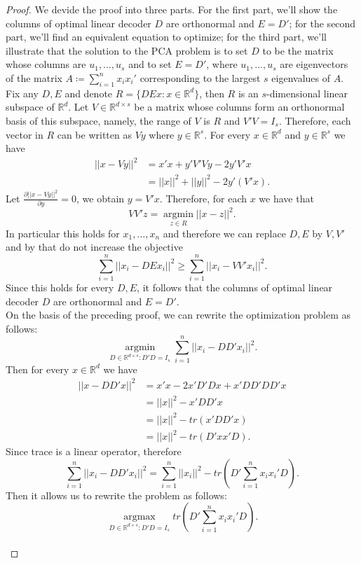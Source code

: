 \begin{proof}
We devide the proof into three parts. For the first part, we'll show the columns of optimal linear decoder $D$ are orthonormal and $E=D'$; for the second part, we'll find an equivalent equation to optimize; for the third part, we'll illustrate that the solution to the PCA problem is to set $D$ to be the matrix whose columns are $u_1,\dots,u_s$ and to set $E=D'$, where $u_1,\dots,u_s$ are eigenvectors of the matrix $A\coloneqq\sum\limits_{i=1}^{n}x_ix_i'$ corresponding to the largest $s$ eigenvalues of $A$.
\\

Fix any $D,E$ and denote $R=\{DEx:x\in {\mathbb R}^d\}$, then $R$ is an $s$-dimensional linear subspace of ${\mathbb R}^d$. Let $V\in {\mathbb R}^{d\times s}$ be a matrix whose columns form an orthonormal basis of this subspace, namely, the range of $V$ is $R$ and $V'V=I_s$. Therefore, each vector in $R$ can be written as $Vy$ where $y\in {\mathbb R}^s$. For every $x\in {\mathbb R}^d$ and $y\in {\mathbb R}^s$ we have
\begin{equation*}
  \begin{aligned}
  ||x-Vy||^2&=x'x+y'V'Vy-2y'V'x\\
  &=||x||^2+||y||^2-2y'(V'x).
  \end{aligned}
\end{equation*}
Let $\frac{\partial ||x-Vy||^2}{\partial y}=0$, we obtain $y=V'x$. Therefore, for each $x$ we have that
$$VV'z=\mathop{\arg\min}\limits_{z\in R}||x-z||^2.$$
In particular this holds for $x_1,\dots,x_n$ and therefore we can replace $D,E$ by $V,V'$ and by that do not increase the objective $$\sum\limits_{i=1}^{n}||x_i-DEx_i||^2\geq\sum\limits_{i=1}^{n}||x_i-VV'x_i||^2.$$
Since this holds for every $D,E$, it follows that the columns of optimal linear decoder $D$ are orthonormal and $E=D'$.
\\

On the basis of the preceding proof, we can rewrite the optimization problem as follows:
$$\mathop{\arg\min}\limits_{D\in{\mathbb R}^{d\times s}:D'D=I_s}\sum\limits_{i=1}^{n}||x_i-DD'x_i||^2.$$
Then for every $x\in {\mathbb R}^d$ we have
\begin{equation*}
  \begin{aligned}
  ||x-DD'x||^2&=x'x-2x'D'Dx+x'DD'DD'x\\
  &=||x||^2-x'DD'x\\
  &=||x||^2-tr(x'DD'x)\\
  &=||x||^2-tr(D'xx'D).
  \end{aligned}
\end{equation*}
Since trace is a linear operator, therefore
$$\sum\limits_{i=1}^{n}||x_i-DD'x_i||^2=\sum\limits_{i=1}^{n}||x_i||^2-tr(D'\sum\limits_{i=1}^{n}x_ix_i'D).$$
Then it allows us to rewrite the problem as follows:
$$\mathop{\arg\max}\limits_{D\in{\mathbb R}^{d\times s}:D'D=I_s}tr(D'\sum\limits_{i=1}^{n}x_ix_i'D).$$
\\


\end{proof}
